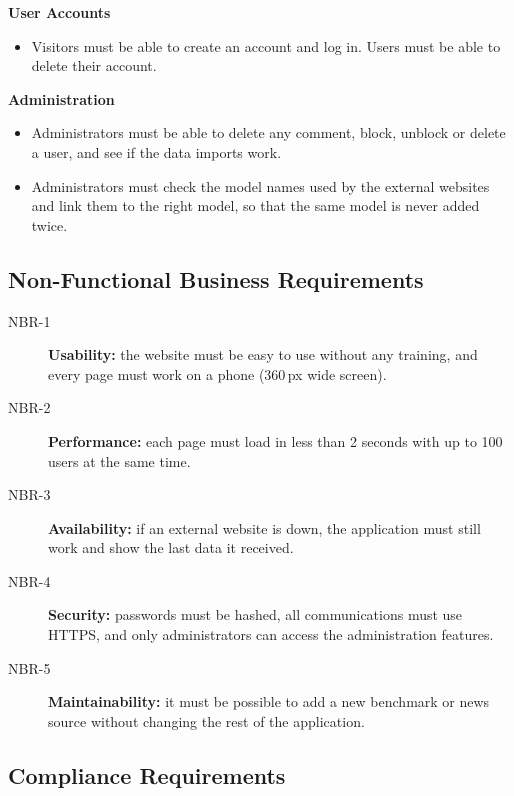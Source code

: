 \documentclass[11pt,a4paper]{article}
\begin{document}
\begin{description}
\begin{itemize}
  \end{itemize}
  \item[BR-7] \textbf{User Accounts}
  \begin{itemize}
    \item Visitors must be able to create an account and log in. Users must be able to delete their account.
  \end{itemize}
  \item[BR-8] \textbf{Administration}
  \begin{itemize}
    \item Administrators must be able to delete any comment, block, unblock or delete a user, and see if the data imports work.
    \item Administrators must check the model names used by the external websites and link them to the right model, so that the same model is never added twice.
  \end{itemize}
\end{description}

\subsection{Non-Functional Business Requirements}

\begin{description}
  \item[NBR-1] \textbf{Usability:} the website must be easy to use without any training, and every page must work on a phone (360\,px wide screen).
  \item[NBR-2] \textbf{Performance:} each page must load in less than 2 seconds with up to 100 users at the same time.
  \item[NBR-3] \textbf{Availability:} if an external website is down, the application must still work and show the last data it received.
  \item[NBR-4] \textbf{Security:} passwords must be hashed, all communications must use HTTPS, and only administrators can access the administration features.
  \item[NBR-5] \textbf{Maintainability:} it must be possible to add a new benchmark or news source without changing the rest of the application.
\end{description}

\subsection{Compliance Requirements}
\end{document}

